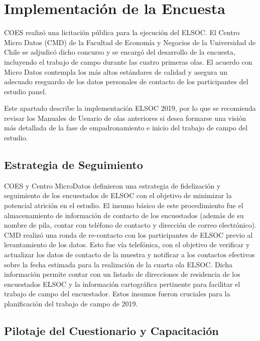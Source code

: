 \documentclass[
]{book}
\begin{document}
\hypertarget{implem_encuest}{%
\chapter{Implementación de la Encuesta}\label{implem_encuest}}

COES realizó una licitación pública para la ejecución del ELSOC. El Centro Micro Datos (CMD) de la Facultad de Economía y Negocios de la Universidad de Chile se adjudicó dicho concurso y se encargó del desarrollo de la encuesta, incluyendo el trabajo de campo durante las cuatro primeras olas. El acuerdo con Micro Datos contempla los más altos estándares de calidad y asegura un adecuado resguardo de los datos personales de contacto de los participantes del estudio panel.

Este apartado describe la implementación ELSOC 2019, por lo que se recomienda revisar los Manuales de Usuario de olas anteriores si desea formarse una visión más detallada de la fase de empadronamiento e inicio del trabajo de campo del estudio.

\hypertarget{estrategia-de-seguimiento}{%
\section{Estrategia de Seguimiento}\label{estrategia-de-seguimiento}}

COES y Centro MicroDatos definieron una estrategia de fidelización y seguimiento de los encuestados de ELSOC con el objetivo de minimizar la potencial atrición en el estudio. El insumo básico de este procedimiento fue el almacenamiento de información de contacto de los encuestados (además de su nombre de pila, contar con teléfono de contacto y dirección de correo electrónico).
CMD realizó una ronda de re-contacto con los participantes de ELSOC previo al levantamiento de los datos. Esto fue vía telefónica, con el objetivo de verificar y actualizar los datos de contacto de la muestra y notificar a los contactos efectivos sobre la fecha estimada para la realización de la cuarta ola ELSOC. Dicha información permite contar con un listado de direcciones de residencia de los encuestados ELSOC y la información cartográfica pertinente para facilitar el trabajo de campo del encuestador. Estos insumos fueron cruciales para la planificación del trabajo de campo de 2019.

\hypertarget{pilotaje-del-cuestionario-y-capacitaciuxf3n}{%
\section{Pilotaje del Cuestionario y Capacitación}\label{pilotaje-del-cuestionario-y-capacitaciuxf3n}}
\end{document}
